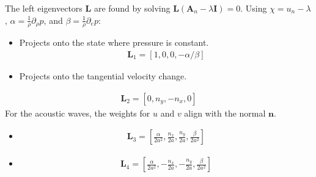 \documentclass[letterpaper,10pt,english]{jupyterBook}
\begin{document}
\sphinxAtStartPar
The left eigenvectors \(\mathbf{L}\) are found by solving \(\mathbf{L}(\mathbf{A}_n - \lambda \mathbf{I}) = 0\). Using \(\chi = u_n - \lambda\), \(\alpha = \frac{1}{\rho}\partial_{\rho}p\), and \(\beta = \frac{1}{\rho}\partial_{e}p\):

\sphinxAtStartPar
{}
\begin{itemize}
\item {} 
\sphinxAtStartPar
{} Projects onto the state where pressure is constant.
\begin{equation*}
\begin{split} \mathbf{L}_1 = [1, 0, 0, -\alpha/\beta] \end{split}
\end{equation*}
\item {} 
\sphinxAtStartPar
{} Projects onto the tangential velocity change.

\end{itemize}
\begin{equation*}
\begin{split} \mathbf{L}_2 = [0, n_y, -n_x, 0] \end{split}
\end{equation*}
\sphinxAtStartPar
{}
For the acoustic waves, the weights for \(u\) and \(v\) align with the normal \(\mathbf{n}\).
\begin{itemize}
\item {} 
\sphinxAtStartPar
{}
\begin{equation*}
\begin{split} \mathbf{L}_3 = \left[ \frac{\alpha}{2a^2}, \frac{n_x}{2a}, \frac{n_y}{2a}, \frac{\beta}{2a^2} \right] \end{split}
\end{equation*}
\item {} 
\sphinxAtStartPar
{}
\begin{equation*}
\begin{split} \mathbf{L}_4 = \left[ \frac{\alpha}{2a^2}, -\frac{n_x}{2a}, -\frac{n_y}{2a}, \frac{\beta}{2a^2} \right] \end{split}
\end{equation*}
\end{itemize}
\end{document}
